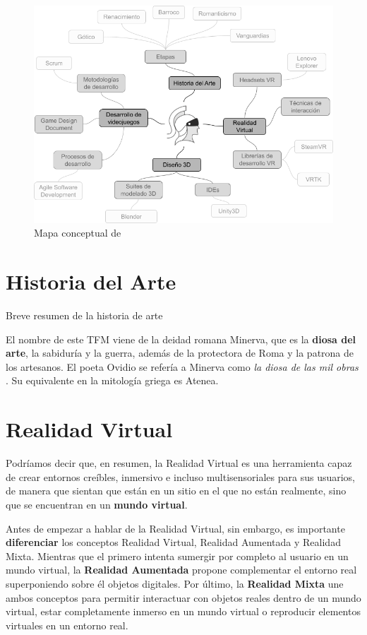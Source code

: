 \begin{figure}[!h]
    \begin{center}
        \includegraphics[width=1\textwidth]{imagenes/2/mapa-conceptual.png}
        \caption{Mapa conceptual de \MineRVa}
        \label{fig:mapa-conceptual}
    \end{center}
\end{figure}

\section{Historia del Arte}

Breve resumen de la historia de arte

El nombre de este \acs{TFM} viene de la deidad romana Minerva, que es la \textbf{diosa del arte}, la sabiduría y la guerra, además de la protectora de Roma y la patrona de los artesanos. El poeta Ovidio se refería a Minerva como \textit{la diosa de las mil obras} \cite{lomb-13}. Su equivalente en la mitología griega es Atenea.

\section{Realidad Virtual}

Podríamos decir que, en resumen, la Realidad Virtual es una herramienta capaz de crear entornos creíbles, inmersivo e incluso multisensoriales para sus usuarios, de manera que sientan que están en un sitio en el que no están realmente, sino que se encuentran en un \textbf{mundo virtual}.

Antes de empezar a hablar de la Realidad Virtual, sin embargo, es importante \textbf{diferenciar} los conceptos Realidad Virtual, Realidad Aumentada y Realidad Mixta. Mientras que el primero intenta sumergir por completo al usuario en un mundo virtual, la \textbf{Realidad Aumentada} propone complementar el entorno real superponiendo sobre él objetos digitales. Por último, la \textbf{Realidad Mixta}  une ambos conceptos para permitir interactuar con objetos reales dentro de un mundo virtual, estar completamente inmerso en un mundo virtual o reproducir elementos virtuales en un entorno real.

